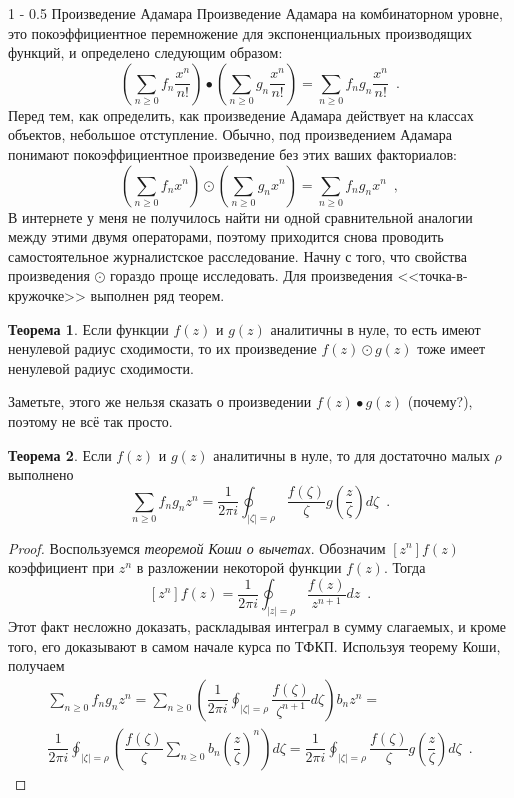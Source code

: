 \documentclass[a5paper]{article}
\makeatletter
\theoremstyle{definition}
\newtheorem*{theorem}{Теорема}
\renewcommand{\subsection}{\@startsection
{subsection}%
{1}%
{\z@}%
{-\baselineskip}%
{0.5\baselineskip}%
{\centering\large\scshape}} %
\makeatother
\begin{document}
\subsection{Произведение Адамара}
Произведение Адамара на комбинаторном уровне, это покоэффициентное перемножение
для экспоненциальных производящих функций, и определено следующим образом:
\[
    \left(
        \sum_{n \geq 0} f_n \dfrac{x^n}{n!}
    \right) \bullet
    \left(
        \sum_{n \geq 0} g_n \dfrac{x^n}{n!}
    \right)  = 
    \sum_{n \geq 0} f_n g_n \dfrac{x^n}{n!} \enspace .
\]
Перед тем, как определить, как произведение Адамара действует на классах
объектов, небольшое отступление.
Обычно, под произведением Адамара понимают покоэффициентное произведение без
этих ваших факториалов:
\[
    \left(
        \sum_{n \geq 0} f_n x^n
    \right) \odot
    \left(
        \sum_{n \geq 0} g_n x^n
    \right)  =
    \sum_{n \geq 0} f_n g_n x^n \enspace , 
\]
В интернете у меня не получилось найти
ни одной сравнительной аналогии между этими двумя операторами, поэтому
приходится снова проводить самостоятельное журналистское расследование.
Начну с того, что свойства произведения \( \odot \) гораздо проще исследовать. Для произведения
<<точка-в-кружочке>> выполнен ряд теорем.
\begin{theorem}
    Если функции \( f(z) \) и \( g(z) \) аналитичны в нуле, то есть имеют
ненулевой радиус сходимости, то их произведение \( f(z) \odot g(z) \) тоже имеет
ненулевой радиус сходимости.
\end{theorem}
Заметьте, этого же нельзя сказать о произведении \( f(z) \bullet g(z) \)
(почему?), поэтому не всё так просто.
\begin{theorem}
Если \( f(z) \) и \( g(z) \) аналитичны в нуле, то для достаточно малых \( \rho
\) выполнено
    \[
    \sum_{n \geq 0} f_n g_n z^n = \dfrac{1}{2\pi i} \oint_{|\zeta| = \rho}
\dfrac{f(\zeta)}{\zeta} g \left( \dfrac{z}{\zeta} \right) d \zeta
    \enspace .
\]
\end{theorem}
\begin{proof}
Воспользуемся \textit{теоремой Коши о вычетах}. Обозначим \( [z^n]f(z) \)
коэффициент при \( z^n \) в разложении некоторой функции \( f(z) \). Тогда
\[
    [z^n] f(z) = \dfrac{1}{2\pi i} \oint_{|z| = \rho} \dfrac{f(z)}{z^{n+1}} dz
\enspace .
\]
Этот факт несложно доказать, раскладывая интеграл в сумму слагаемых, и кроме
того, его доказывают в самом начале курса по ТФКП. Используя теорему Коши,
получаем
\begin{multline*}
    \sum_{n \geq 0} f_n g_n z^n =
    \sum_{n \geq 0} \left(
        \dfrac{1}{2\pi i} \oint_{|\zeta| = \rho} \dfrac{f(\zeta)}{\zeta^{n+1}} d
    \zeta
    \right) b_n z^n
    = \\
    \dfrac{1}{2\pi i} \oint_{|\zeta| = \rho}
    \left(
        \dfrac{f(\zeta)}{\zeta} \sum_{n \geq 0} b_n \left( \dfrac{z}{\zeta}
    \right)^n
    \right) d \zeta = \dfrac{1}{2\pi i} \oint_{|\zeta| = \rho}
    \dfrac{f(\zeta)}{\zeta} g\left( \dfrac z \zeta \right) d \zeta \enspace .
\end{multline*}
\end{proof}
\end{document}
